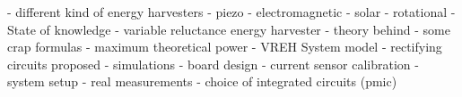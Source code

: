 - different kind of energy harvesters
    - piezo
    - electromagnetic
    - solar
    - rotational
- State of knowledge
- variable reluctance energy harvester
    - theory behind
    - some crap formulas
    - maximum theoretical power
- VREH System model
- rectifying circuits proposed
- simulations
- board design
- current sensor calibration
- system setup
- real measurements
- choice of integrated circuits (pmic)











